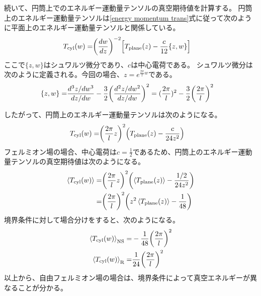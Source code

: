 \documentclass[11pt, dvipdfmx]{article}
\numberwithin{equation}{section}
\begin{document}
続いて、円筒上でのエネルギー運動量テンソルの真空期待値を計算する。
円筒上のエネルギー運動量テンソルは\eqref{energy momentum trans}式に従って次のように平面上のエネルギー運動量テンソルと関係している。
\begin{align}
    T_{\text{cyl}}(w)=&\qty(\frac{dw}{dz})^{-2}\qty[T_{\text{plane}}(z) - \frac{c}{12} \{z,w\}]
\end{align}
ここで$\{z,w\}$はシュワルツ微分であり、$c$は中心電荷である。
シュワルツ微分は次のように定義される。今回の場合、$z=e^{\frac{2\pi}{l}w}$である。
\begin{align}
    \{z,w\}=& \frac{d^3 z/dw^3}{dz/dw} - \frac{3}{2}\qty(\frac{d^2 z/dw^2}{dz/dw})^2=(\frac{2\pi}{l})^2-\frac{3}{2}\qty(\frac{2\pi}{l})^2
\end{align}

したがって、円筒上のエネルギー運動量テンソルは次のようになる。
\begin{align}
    T_{\text{cyl}}(w)=&\qty(\frac{2\pi}{l}z)^2 \qty(T_{\text{plane}}(z)-\frac{c}{24z^2})
\end{align}
フェルミオン場の場合、中心電荷は$c=\frac{1}{2}$であるため、円筒上のエネルギー運動量テンソルの真空期待値は次のようになる。
\begin{align}
    \ev{T_{\text{cyl}}(w)}=&\qty(\frac{2\pi}{l}z)^2 \qty(\ev{T_{\text{plane}}(z)}-\frac{1/2}{24 z^2})\\
    =&\qty(\frac{2\pi}{l})^2 \qty(z^2 \ev{T_{\text{plane}}(z)} - \frac{1}{48})
\end{align}
境界条件に対して場合分けをすると、次のようになる。
\begin{align}
    \ev{T_{\text{cyl}}(w)}_{\text{NS}}=& -\frac{1}{48}\qty(\frac{2\pi}{l})^2\\
    \ev{T_{\text{cyl}}(w)}_{\text{R}}=& \frac{1}{24}\qty(\frac{2\pi}{l})^2
\end{align}
以上から、自由フェルミオン場の場合は、境界条件によって真空エネルギーが異なることが分かる。
\end{document}
